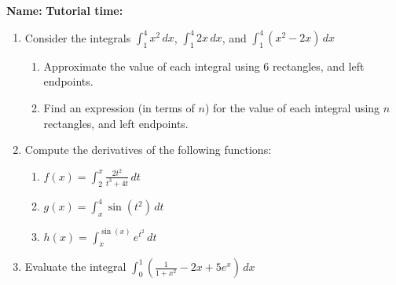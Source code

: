 \documentclass[12pt]{article}
\newcommand{\di}{\displaystyle}
\begin{document}
{\bf \large Name:} \hspace{2.5in} {\bf Tutorial time:}

\bigskip

\bigskip

\thispagestyle{fancy}

\begin{enumerate}
 \item Consider the integrals $\displaystyle \int_1^4 x^2\,dx$, $\displaystyle \int_1^4 2x\,dx$, and $\displaystyle \int_1^4 (x^2-2x)\,dx$
\begin{enumerate}
 \item Approximate the value of each integral using 6 rectangles, and left endpoints.

\vspace{3in}

 \item Find an expression (in terms of $n$) for the value of each integral using $n$ rectangles, and left endpoints.
\end{enumerate}
\newpage

 \item Compute the derivatives of the following functions:
\begin{enumerate}
 \item $\di f(x) = \int_2^x\frac{2t^2}{t^3+4t}\,dt$

\vspace{1in}

 \item $\di g(x) = \int_x^4\sin(t^2)\,dt$

\vspace{1in}

 \item $\di h(x) = \int_x^{\sin(x)} e^{t^2}\,dt$

\vspace{2in}

\end{enumerate}

 \item Evaluate the integral $\di \int_0^1\left(\frac{1}{1+x^2}-2x+5e^x\right)\,dx$
\end{enumerate}
\end{document}
